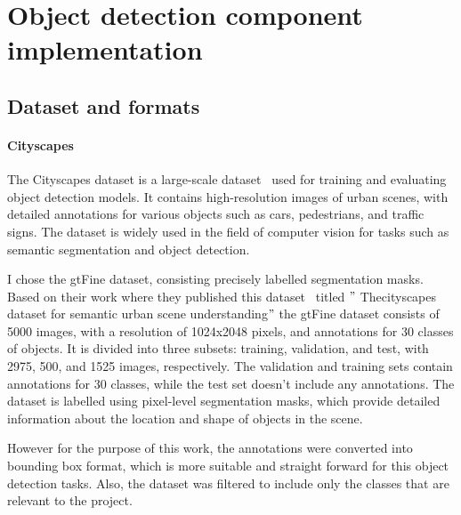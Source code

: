 


\section{Object detection component implementation}\label{sec:object-detection-component-implementation}

\subsection{Dataset and formats}\label{subsec:dataset-and-formats}

\paragraph{Cityscapes}\label{par:cityscapes}
The Cityscapes dataset is a large-scale dataset~\cite{Cordts2016Cityscapes} used for training and evaluating object detection models.
It contains high-resolution images of urban scenes, with detailed annotations for various objects such as cars,
pedestrians, and traffic signs.
The dataset is widely used in the field of computer vision for tasks such as semantic segmentation and object detection.

I chose the gtFine dataset, consisting precisely labelled segmentation masks.
Based on their work where they published this dataset~\cite{Cordts2016Cityscapes} titled \("\)
Thecityscapes dataset for semantic urban scene understanding\("\) the gtFine dataset consists of 5000 images,
with a resolution of 1024x2048 pixels, and annotations for 30 classes of objects.
It is divided into three subsets: training, validation, and test, with 2975, 500, and 1525 images, respectively.
The validation and training sets contain annotations for 30 classes, while the test set doesn't include any annotations.
The dataset is labelled using pixel-level segmentation masks, which provide detailed information about the
location and shape of objects in the scene.

However for the purpose of this work, the annotations were converted into bounding box format,
which is more suitable and straight forward for this object detection tasks.
Also, the dataset was filtered to include only the classes that are relevant to the project.

